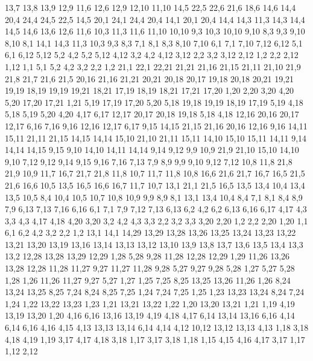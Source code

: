 13,7
13,8
13,9
12,9
%
11,6
12,6
12,9
12,10
11,10
%
14,5
22,5
22,6
21,6
18,6
14,6
%
14,4
20,4
24,4
24,5
22,5
14,5
%
20,1
24,1
24,4
20,4
%
14,1
20,1
20,4
14,4
14,3
%
11,3
14,3
14,4
14,5
14,6
13,6
12,6
11,6
%
10,3
11,3
11,6
11,10
10,10
%
9,3
10,3
10,10
9,10
%
8,3
9,3
9,10
8,10
%
8,1
14,1
14,3
11,3
10,3
9,3
8,3
%
7,1
8,1
8,3
8,10
7,10
%
6,1
7,1
7,10
7,12
6,12
%
5,1
6,1
6,12
5,12
5,2
%
4,2
5,2
5,12
4,12
%
3,2
4,2
4,12
3,12
%
2,2
3,2
3,12
2,12
%
1,2
2,2
2,12
1,12
%
1,1
5,1
5,2
4,2
3,2
2,2
1,2
21,1
22,1
22,21
21,21
21,16
21,15
21,11
21,10
21,9
21,8
21,7
21,6
21,5
%
20,16
21,16
21,21
20,21
20,18
20,17
%
19,18
20,18
20,21
19,21
19,19
%
18,19
19,19
19,21
18,21
%
17,19
18,19
18,21
17,21
17,20
%
1,20
2,20
3,20
4,20
5,20
17,20
17,21
1,21
%
5,19
17,19
17,20
5,20
%
5,18
19,18
19,19
18,19
17,19
5,19
%
4,18
5,18
5,19
5,20
4,20
%
4,17
6,17
12,17
20,17
20,18
19,18
5,18
4,18
%
12,16
20,16
20,17
12,17
%
6,16
7,16
9,16
12,16
12,17
6,17
%
9,15
14,15
21,15
21,16
20,16
12,16
9,16
%
14,11
15,11
21,11
21,15
14,15
14,14
%
15,10
21,10
21,11
15,11
%
14,10
15,10
15,11
14,11
%
9,14
14,14
14,15
9,15
%
9,10
14,10
14,11
14,14
9,14
9,12
%
9,9
10,9
21,9
21,10
15,10
14,10
9,10
%
7,12
9,12
9,14
9,15
9,16
7,16
7,13
%
7,9
8,9
9,9
9,10
9,12
7,12
%
10,8
11,8
21,8
21,9
10,9
%
11,7
16,7
21,7
21,8
11,8
%
10,7
11,7
11,8
10,8
%
16,6
21,6
21,7
16,7
%
16,5
21,5
21,6
16,6
%
10,5
13,5
16,5
16,6
16,7
11,7
10,7
%
13,1
21,1
21,5
16,5
13,5
13,4
%
10,4
13,4
13,5
10,5
%
8,4
10,4
10,5
10,7
10,8
10,9
9,9
8,9
%
8,1
13,1
13,4
10,4
8,4
%
7,1
8,1
8,4
8,9
7,9
%
6,13
7,13
7,16
6,16
%
6,1
7,1
7,9
7,12
7,13
6,13
6,2
%
4,2
6,2
6,13
6,16
6,17
4,17
4,3
%
3,3
4,3
4,17
4,18
4,20
3,20
%
3,2
4,2
4,3
3,3
%
2,2
3,2
3,3
3,20
2,20
%
1,2
2,2
2,20
1,20
%
1,1
6,1
6,2
4,2
3,2
2,2
1,2
13,1
14,1
14,29
13,29
13,28
13,26
13,25
13,24
13,23
13,22
13,21
13,20
13,19
13,16
13,14
13,13
13,12
13,10
13,9
13,8
13,7
13,6
13,5
13,4
13,3
13,2
%
12,28
13,28
13,29
12,29
%
1,28
5,28
9,28
11,28
12,28
12,29
1,29
%
11,26
13,26
13,28
12,28
11,28
11,27
%
9,27
11,27
11,28
9,28
%
5,27
9,27
9,28
5,28
%
1,27
5,27
5,28
1,28
%
1,26
11,26
11,27
9,27
5,27
1,27
%
1,25
7,25
8,25
13,25
13,26
11,26
1,26
%
8,24
13,24
13,25
8,25
%
7,24
8,24
8,25
7,25
%
1,24
7,24
7,25
1,25
%
1,23
13,23
13,24
8,24
7,24
1,24
%
1,22
13,22
13,23
1,23
%
1,21
13,21
13,22
1,22
%
1,20
13,20
13,21
1,21
%
1,19
4,19
13,19
13,20
1,20
%
4,16
6,16
13,16
13,19
4,19
4,18
4,17
%
6,14
13,14
13,16
6,16
%
4,14
6,14
6,16
4,16
4,15
%
4,13
13,13
13,14
6,14
4,14
%
4,12
10,12
13,12
13,13
4,13
%
1,18
3,18
4,18
4,19
1,19
%
3,17
4,17
4,18
3,18
%
1,17
3,17
3,18
1,18
%
1,15
4,15
4,16
4,17
3,17
1,17
%
1,12
2,12
